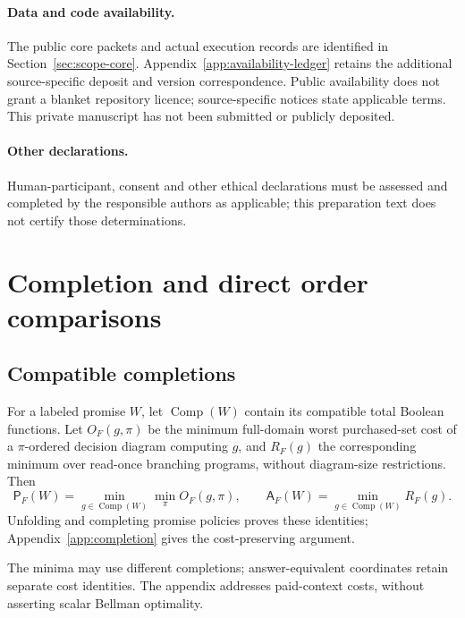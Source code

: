 \documentclass[pdflatex,sn-mathphys-num]{sn-jnl}
\newcommand{\A}{\mathsf{A}}
\newcommand{\Pcost}{\mathsf{P}}
\newcommand{\Comp}{\operatorname{Comp}}
\theoremstyle{thmstyleone}
\theoremstyle{thmstylethree}
\theoremstyle{thmstyletwo}
\begin{document}
\paragraph*{Data and code availability.}
The public core packets and actual execution records are identified in
Section~\ref{sec:scope-core}. Appendix~\ref{app:availability-ledger}
retains the additional source-specific deposit and version correspondence.
Public availability does not grant a blanket repository licence;
source-specific notices state applicable terms. This private manuscript
has not been submitted or publicly deposited.

\paragraph*{Other declarations.}
Human-participant, consent and other ethical declarations must be assessed and completed by the responsible authors as applicable; this preparation text does not certify those determinations.


\clearpage
\label{page:references-start}

\clearpage
\appendix

\section{Completion and direct order comparisons}\label{app:completion-comparisons}
\subsection{Compatible completions}\label{sec:completion}
For a labeled promise $W$, let $\Comp(W)$ contain its compatible total Boolean functions. Let $O_F(g,\pi)$ be the minimum full-domain worst purchased-set cost of a $\pi$-ordered decision diagram computing $g$, and $R_F(g)$ the corresponding minimum over read-once branching programs, without diagram-size restrictions. Then
\[
 \Pcost_F(W)=\min_{g\in\Comp(W)}\min_\pi O_F(g,\pi),\qquad
 \A_F(W)=\min_{g\in\Comp(W)}R_F(g).
\]
Unfolding and completing promise policies proves these identities; Appendix~\ref{app:completion} gives the cost-preserving argument.

The minima may use different completions; answer-equivalent coordinates retain separate cost identities. The appendix addresses paid-context costs, without asserting scalar Bellman optimality.
\end{document}
